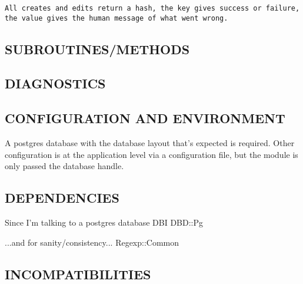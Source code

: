 \documentclass{book}
\begin{document}
\begin{lstlisting}[frame=lines,gobble=1]
 All creates and edits return a hash, the key gives success or failure, the value gives the human message of what went wrong.
\end{lstlisting}


\subsection{SUBROUTINES/METHODS}
\label{Inventory_SUBROUTINES_METHODS}
\hypertarget{Inventory_SUBROUTINES_METHODS}{}


\subsection{DIAGNOSTICS}
\label{Inventory_DIAGNOSTICS}
\hypertarget{Inventory_DIAGNOSTICS}{}


\subsection{CONFIGURATION AND ENVIRONMENT}
\label{Inventory_CONFIGURATION_AND_ENVIRONMENT}
\hypertarget{Inventory_CONFIGURATION_AND_ENVIRONMENT}{}



A postgres database with the database layout that's expected is required. Other configuration is at the application level via a configuration file, but the module is only passed the database handle.


\subsection{DEPENDENCIES}
\label{Inventory_DEPENDENCIES}
\hypertarget{Inventory_DEPENDENCIES}{}



Since I'm talking to a postgres database DBI DBD::Pg



...and for sanity/consistency... Regexp::Common


\subsection{INCOMPATIBILITIES}
\label{Inventory_INCOMPATIBILITIES}
\hypertarget{Inventory_INCOMPATIBILITIES}{}
\end{document}
